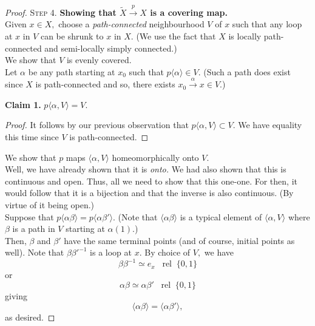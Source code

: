 \documentclass[12pt]{article}
\newcommand{\rel}{\;\;\operatorname{rel}\;}
\newenvironment{blockquote}
{\begin{mdframed}[skipabove=0pt, skipbelow=0pt, innertopmargin=4pt, innerbottommargin=4pt, bottomline=false,topline=false,rightline=false, linewidth=2pt]}
{\end{mdframed}}
\begin{document}
\begin{proof}
\textsc{Step 4.} \textbf{Showing that $\tilde{X} \overset{p}{\longrightarrow} X$ is a covering map.}\\
Given $x \in X,$ choose a \emph{path-connected} neighbourhood $V$ of $x$ such that any loop at $x$ in $V$ can be shrunk to $x$ in $X.$ (We use the fact that $X$ is locally path-connected and semi-locally simply connected.) \\
We show that $V$ is evenly covered. \\
Let $\alpha$ be any path starting at $x_0$ such that $p\langle \alpha\rangle \in V.$ (Such a path does exist since $X$ is path-connected and so, there exists $x_0\overset{\alpha}{\longrightarrow} x \in V.$) \\
\begin{blockquote}
	\textbf{Claim 1.} $p\langle \alpha, V\rangle = V.$
	\begin{proof} 
		It follows by our previous observation that $p\langle \alpha, V\rangle \subset V.$ We have equality this time since $V$ is path-connected.
	\end{proof}
\end{blockquote}
We show that $p$ maps $\langle \alpha, V\rangle$ homeomorphically onto $V.$\\
Well, we have already shown that it is \emph{onto.} We had also shown that this is continuous and open. Thus, all we need to show that this one-one. For then, it would follow that it is a bijection and that the inverse is also continuous. (By virtue of it being open.)\\
Suppose that $p\langle \alpha\beta\rangle = p\langle \alpha\beta'\rangle.$ (Note that $\langle \alpha\beta\rangle$ is a typical element of $\langle \alpha, V\rangle$ where $\beta$ is a path in $V$ starting at $\alpha(1)$.)\\
Then, $\beta$ and $\beta'$ have the same terminal points (and of course, initial points as well). Note that $\beta\beta'^{-1}$ is a loop at $x.$ By choice of $V,$ we have
\begin{equation*} 
	\beta\beta^{-1} \simeq e_x \rel\{0, 1\}
\end{equation*}
or
\begin{equation*} 
	\alpha\beta \simeq \alpha\beta' \rel\{0, 1\}
\end{equation*}
giving
\begin{equation*} 
	\langle \alpha\beta\rangle = \langle \alpha\beta'\rangle,
\end{equation*}
as desired.


\end{proof}
\end{document}

